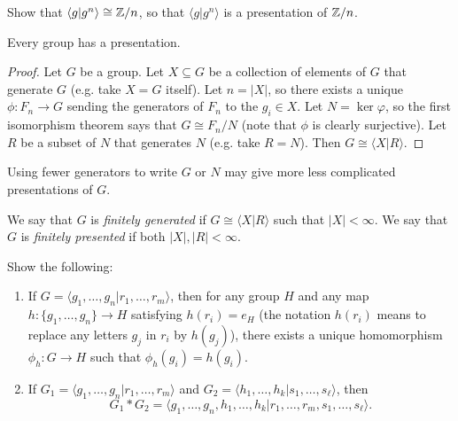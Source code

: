 \begin{exercise}
  Show that $\langle g | g^n \rangle \cong \mathbb{Z} / n$, so that $\langle g | g^n \rangle$ is a
  presentation of $\mathbb{Z} / n$.
\end{exercise}

\begin{lemma}
  Every group has a presentation.
\end{lemma}

\begin{proof}
  Let $G$ be a group. Let $X \subseteq G$ be a
  collection of elements of $G$ that generate $G$
  (e.g. take $X = G$ itself). Let $n = |X|$, so
  there exists a unique $\phi : F_n \to G$
  sending the generators of $F_n$ to the $g_i \in X$.
  Let $N = \ker \varphi$, so the first isomorphism
  theorem says that $G \cong F_n / N$ (note that
  $\phi$ is clearly surjective). Let
  $R$ be a subset of $N$ that generates $N$
  (e.g. take $R = N$). Then
  $G \cong \langle X | R \rangle$.
\end{proof}

\begin{remark}
  Using fewer generators to write $G$ or $N$ may give
  more less complicated presentations of $G$.
\end{remark}

\begin{definition}
  We say that $G$ is \emph{finitely generated}
  if $G \cong \langle X | R \rangle$ such that
  $|X| < \infty$. We say that $G$ is
  \emph{finitely presented} if both
  $|X|, |R| < \infty$.
\end{definition}

\begin{exercise}
   Show the following:
   \begin{enumerate}
     \item If $G = \langle g_1, \dots, g_n | r_1, \dots, r_m \rangle$, then for any group $H$ and
       any map $h : \{g_1, \dots, g_n\} \to H$
       satisfying $h(r_i) = e_H$ (the notation
       $h(r_i)$ means to replace
       any letters $g_j$ in $r_i$ by $h(g_j)$),
       there exists a unique homomorphism
       $\phi_h : G \to H$ such that
       $\phi_h(g_i) = h(g_i)$.
     \item If $G_1 = \langle g_1, \dots, g_n | r_1, \dots, r_m \rangle$ and
       $G_2 = \langle h_1, \dots, h_k | s_1, \dots, s_\ell \rangle$, then
       \[
         G_1 * G_2 = \langle g_1, \dots, g_n, h_1, \dots, h_k | r_1, \dots, r_m, s_1, \dots, s_\ell \rangle.
       \]
   \end{enumerate}
\end{exercise}

